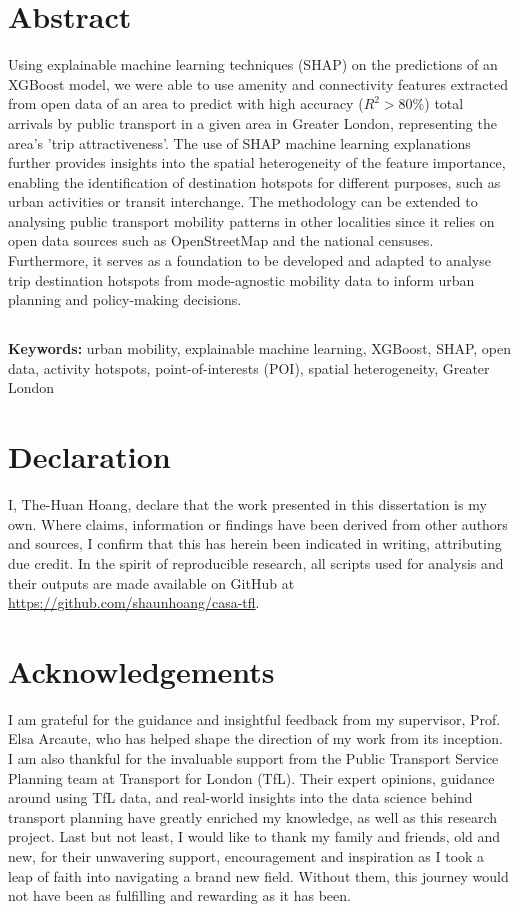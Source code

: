 \chapter*{Abstract}
Using explainable machine learning techniques (SHAP) on the predictions of an XGBoost model, we were able to use amenity and connectivity features extracted from open data of an area to predict with high accuracy ($R^2>80\%$) total arrivals by public transport in a given area in Greater London, representing the area's 'trip attractiveness'. The use of SHAP machine learning explanations further provides insights into the spatial heterogeneity of the feature importance, enabling the identification of destination hotspots for different purposes, such as urban activities or transit interchange. The methodology can be extended to analysing public transport mobility patterns in other localities since it relies on open data sources such as OpenStreetMap and the national censuses. Furthermore, it serves as a foundation to be developed and adapted to analyse trip destination hotspots from mode-agnostic mobility data to inform urban planning and policy-making decisions.

\section*{}
\textbf{Keywords:} urban mobility, explainable machine learning, XGBoost, SHAP, open data, activity hotspots, point-of-interests (POI), spatial heterogeneity, Greater London

\chapter*{Declaration}
I, The-Huan Hoang, declare that the work presented in this dissertation is my own. Where claims, information or findings have been derived from other authors and sources, I confirm that this has herein been indicated in writing, attributing due credit. In the spirit of reproducible research, all scripts used for analysis and their outputs are made available on GitHub at \url{https://github.com/shaunhoang/casa-tfl}. 

\chapter*{Acknowledgements}
I am grateful for the guidance and insightful feedback from my supervisor, Prof. Elsa Arcaute, who has helped shape the direction of my work from its inception. I am also thankful for the invaluable support from the Public Transport Service Planning team at Transport for London (TfL). Their expert opinions, guidance around using TfL data, and real-world insights into the data science behind transport planning have greatly enriched my knowledge, as well as this research project. Last but not least, I would like to thank my family and friends, old and new, for their unwavering support, encouragement and inspiration as I took a leap of faith into navigating a brand new field. Without them, this journey would not have been as fulfilling and rewarding as it has been.

\tableofcontents

\listoffigures

\listoftables